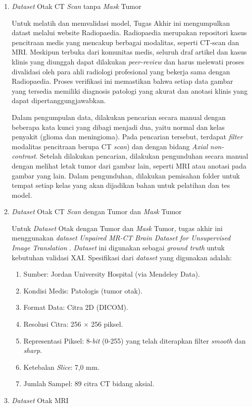 \begin{enumerate}
	\item \textit{Dataset} Otak CT \textit{Scan} tanpa \textit{Mask} Tumor
	
	Untuk melatih dan memvalidasi model, Tugas Akhir ini mengumpulkan datast melalui website Radiopaedia. Radiopaedia merupakan repositori kasus pencitraan medis yang mencakup berbagai modalitas, seperti CT-scan dan MRI. Meskipun terbuka dari komunitas medis, seluruh draf artikel dan kasus klinis yang diunggah dapat dilakukan \textit{peer-review} dan harus melewati proses divalidasi oleh para ahli radiologi profesional yang bekerja sama dengan Radiopaedia. Proses verifikasi ini memastikan bahwa setiap data gambar yang tersedia memiliki diagnosis patologi yang akurat dan anotasi klinis yang dapat dipertanggungjawabkan.
	
	Dalam pengumpulan data, dilakukan pencarian secara manual dengan beberapa kata kunci yang dibagi menjadi dua, yaitu normal dan kelas penyakit (glioma dan meningioma). Pada pencarian tersebut, terdapat \textit{filter} modalitas pencitraan berupa CT \textit{scan}) dan dengan bidang \textit{Axial} \textit{non-contrast}. Setelah dilakukan pencarian, dilakukan pengunduhan secara manual dengan melihat letak tumor dari gambar lain, seperti MRI atau anotasi pada gambar yang lain. Dalam pengunduhan, dilakukan pemisahan folder untuk tempat setiap kelas yang akan dijadikan bahan untuk pelatihan dan tes model.
	
	\item \textit{Dataset} Otak CT \textit{Scan} dengan Tumor dan \textit{Mask} Tumor
	
	Untuk \textit{Dataset} Otak dengan Tumor dan \textit{Mask} Tumor, tugas akhir ini menggunakan \textit{dataset} \textit{Unpaired MR-CT Brain Dataset for Unsupervised Image Translation} \cite{AlKadi2022Unpaired}. \textit{Dataset} ini digunakan sebagai \textit{ground truth} untuk kebutuhan validasi XAI. Spesifikasi dari \textit{dataset} yang digunakan adalah:
	
	\begin{enumerate}
		\item Sumber: Jordan University Hospital (via Mendeley Data).
		\item Kondisi Medis: Patologis (tumor otak).
		\item Format Data: Citra 2D (DICOM).
		\item Resolusi Citra: 256 $\times$ 256 piksel.
		\item Representasi Piksel: 8-\textit{bit} (0-255) yang telah diterapkan filter \textit{smooth} dan \textit{sharp}.
		\item Ketebalan \textit{Slice}: 7,0 mm.
		\item Jumlah Sampel: 89 citra CT bidang aksial.
	\end{enumerate}
	
	\item \textit{Dataset} Otak MRI

\end{enumerate}

